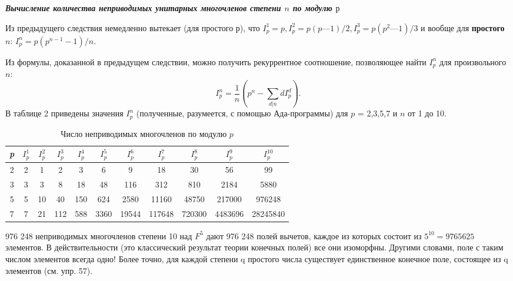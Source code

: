 \documentclass{mai_book}
\begin{document}
\noindent\textbf{\textit{Вычисление количества неприводимых унитарных\newline 
многочленов степени $n$ по модулю $р$ }}

Из предыдущего следствия немедленно вытекает (для простого $р$), 
что $I^1_p = p, I^2_p = p(p — 1)\slash2, I^3_p = p(p^2 — 1)\slash3$ и вообще для  \textbf{простого} $n$: 
$I^n_p = p(p^{n-1} - 1)\slash n$. 

Из формулы, доказанной в предыдущем следствии, можно получить 
рекуррентное соотношение, позволяющее найти $I^n_p$ для  
произвольного $n$: 
\begin{equation*}
I^n_p = \frac{1}{n}(p^n - \sum_{d|n}dI^d_p).
\end{equation*}
В таблице 2 приведены значения $I^n_p$ (полученные, разумеется, с  
помощью Ада-программы) для $p$ = 2,3,5,7 и $n$ от 1 до 10. 

\begin{table}[h!]
\centering
\label{}
\begin{small}
\begin{tabular}{|c|cccccccccc|}
\hline
\textit{p} & $I^1_p$ & $I^2_p$ & $I^3_p$ & $I^4_p$ & $I^5_p$ & $I^6_p$ & $I^7_p$  & $I^8_p$  & $I^9_p$   & $I^{10}_p$   \\ \hline
2          & 2     & 1     & 2     & 3     & 6     & 9     & 18     & 30     & 56      & 99       \\
3          & 3     & 3     & 8     & 18    & 48    & 116   & 312    & 810    & 2184    & 5880     \\
5          & 5     & 10    & 40    & 150   & 624   & 2580  & 11160  & 48750  & 217000  & 976248   \\
7          & 7     & 21    & 112   & 588   & 3360  & 19544 & 117648 & 720300 & 4483696 & 28245840 \\ \hline
\end{tabular}
\end{small}
\caption{Число неприводимых многочленов по модулю $p$} 
\end{table}

\begin{mynotice}
976 248 неприводимых многочленов степени 10 над 
$F^5$ дают 976 248 полей вычетов, каждое из которых состоит из 
$5^10 = 9 765 625$ элементов. В действительности (это классический 
результат теории конечных полей) все они изоморфны. Другими 
словами, поле с таким числом элементов всегда одно! Более точно, 
для каждой степени q простого числа существует единственное 
конечное поле, состоящее из q элементов (см. упр. 57).\newline 
\end{mynotice}
\end{document}
